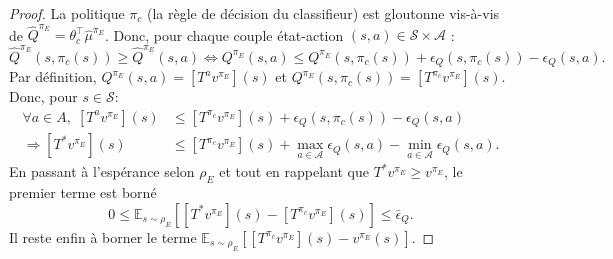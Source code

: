 \documentclass[english,utf8]{./hermes-journal}
\newcommand{\s}{\mathcal{S}}
\newcommand{\A}{\mathcal{A}}
\newcommand{\E}{\mathbb{E}}
\begin{document}
\begin{proof}
  La politique $\pi_c$ (la règle de décision du classifieur) est gloutonne vis-à-vis de 
  $\hat{Q}^{\pi_E}=\theta_c^\top\hat{\mu}^{\pi_E}$. Donc, pour chaque couple état-action
  $(s,a)\in\s\times \A$ :
  \begin{equation}
    \hat{Q}^{\pi_E}(s,\pi_c(s))\geq
    \hat{Q}^{\pi_E}(s,a)
    \Leftrightarrow
    Q^{\pi_E}(s,a) \leq Q^{\pi_E}(s,\pi_c(s)) +
    \epsilon_Q(s,\pi_c(s)) - \epsilon_Q(s,a).
  \end{equation}
  Par définition, $Q^{\pi_E}(s,a) = [T^a v^{\pi_E}](s)$ et
  $Q^{\pi_E}(s,\pi_c(s)) = [T^{\pi_c} v^{\pi_E}](s)$. Donc, pour $s\in\s$:
  \begin{align}
    \forall a\in A,\; [T^a v^{\pi_E}](s) &\leq [T^{\pi_c}
    v^{\pi_E}](s) + \epsilon_Q(s,\pi_c(s))-\epsilon_Q(s,a)
    \\
    \Rightarrow [T^* v^{\pi_E}](s) &\leq [T^{\pi_c}
    v^{\pi_E}](s) + \max_{a\in \A}\epsilon_Q(s,a)-\min_{a\in
    \A}\epsilon_Q(s,a).
  \end{align}
  En passant à l'espérance selon $\rho_E$ et tout en rappelant que 
  $T^* v^{\pi_E}\geq v^{\pi_E}$, le premier terme est borné
  \begin{equation}
    0 \leq \E_{s\sim\rho_E}\left[ [T^* v^{\pi_E}](s) - [T^{\pi_c}
    v^{\pi_E}](s)\right] \leq \bar{\epsilon}_Q.
    \label{eq:proof:b1}
  \end{equation}
  Il reste enfin à borner le terme $\E_{s\sim\rho_E}[[T^{\pi_c}v^{\pi_E}](s) -
  v^{\pi_E}(s)]$.


\end{proof}
\end{document}
